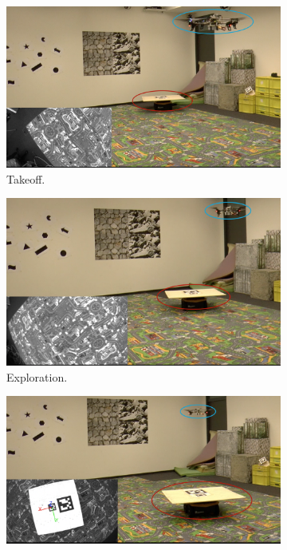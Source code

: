 \begin{figure}[!htbp]
  \centering
   \begin{subfigure}[b]{0.5\textwidth}
        \includegraphics[width=\textwidth]{img/takeoff2.png}
        \caption{Takeoff.}
   \end{subfigure}
   \begin{subfigure}[b]{0.5\textwidth}
        \includegraphics[width=\textwidth]{img/exploring2.png}
        \caption{Exploration.}
        \label{fig:two}
   \end{subfigure}
   \begin{subfigure}[b]{0.5\textwidth}
        \includegraphics[width=\textwidth]{img/align2.png}

\end{subfigure}
\end{figure}
